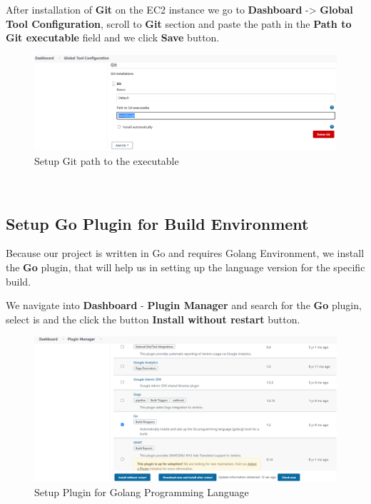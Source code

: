 \documentclass[12pt,a4paper,twoside]{article}
\begin{document}
After installation of \textbf{Git} on the EC2 instance we go to \textbf{Dashboard} -> \textbf{Global Tool Configuration}, scroll to \textbf{Git} section and paste the path in the \textbf{Path to Git executable} field and we click \textbf{Save} button.


\begin{figure}[H]
    \centering
        \includegraphics[width=15cm]{images-aws/29-jenkins-git-set-path.png}
        \caption{Setup Git path to the executable}
\end{figure}



~\newpage


\subsection{Setup Go Plugin for Build Environment}


Because our project is written in Go and requires Golang Environment, we install the \textbf{Go} plugin, that will help us in setting up the language version for the specific build.

We navigate into \textbf{Dashboard} - \textbf{Plugin Manager} and search for the \textbf{Go} plugin, select is and the click the button \textbf{Install without restart} button.


\begin{figure}[h!]
    \centering
        \includegraphics[width=15cm]{images-aws/30-go-plugin.png}
        \caption{Setup Plugin for Golang Programming Language}
\end{figure}
\end{document}
